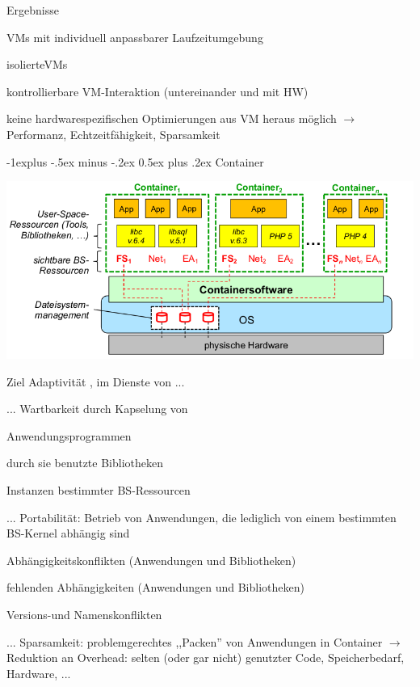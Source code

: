 \documentclass[a4paper]{article}
\makeatletter
\newcommand{\cmark}{\ding{51}}
\newcommand{\xmark}{\ding{55}}
\renewcommand{\subsection}{\@startsection{subsection}{2}{0mm}%
 {-1explus -.5ex minus -.2ex}%
 {0.5ex plus .2ex}%
 {\normalfont\normalsize\bfseries}}
\makeatother
\begin{document}
\begin{multicols}{3}
    Ergebnisse
    \begin{itemize*}
        \item[\cmark] VMs mit individuell anpassbarer Laufzeitumgebung
        \item[\cmark] isolierteVMs
        \item[\cmark] kontrollierbare VM-Interaktion (untereinander und mit HW)
        \item[\xmark] keine hardwarespezifischen Optimierungen aus VM heraus möglich $\rightarrow$ Performanz, Echtzeitfähigkeit, Sparsamkeit
    \end{itemize*}

    \subsection{Container}
    \begin{center}
        \includegraphics[width=.6\linewidth]{Assets/AdvancedOperatingSystems-container.png}
    \end{center}
    \begin{itemize*}
        \item Ziel Adaptivität , im Dienste von ...
        \item ... Wartbarkeit %
        durch Kapselung von
        \begin{itemize*}
            \item Anwendungsprogrammen
            \item durch sie benutzte Bibliotheken
            \item Instanzen bestimmter BS-Ressourcen
        \end{itemize*}
        \item ... Portabilität: Betrieb von Anwendungen, die lediglich von einem bestimmten BS-Kernel abhängig sind %
        \begin{itemize*}
            \item Abhängigkeitskonflikten (Anwendungen und Bibliotheken)
            \item fehlenden Abhängigkeiten (Anwendungen und Bibliotheken)
            \item Versions-und Namenskonflikten
        \end{itemize*}
        \item ... Sparsamkeit: problemgerechtes ,,Packen'' von Anwendungen in Container $\rightarrow$ Reduktion an Overhead: selten (oder gar nicht) genutzter Code, Speicherbedarf, Hardware, ...
    \end{itemize*}


\end{multicols}
\end{document}
